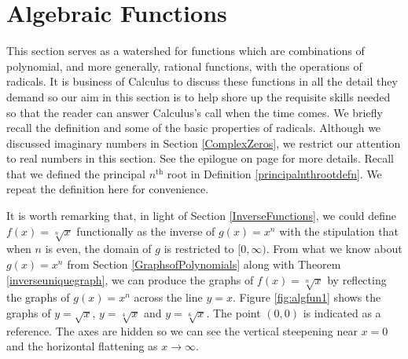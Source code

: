 \section{Algebraic Functions}

\label{AlgebraicFunctions}

This section serves as a watershed for functions which are combinations of polynomial, and more generally, rational functions, with the operations of radicals.  It is business of Calculus to discuss these functions in all the detail they demand so our aim in this section is to help shore up the requisite skills needed so that the reader can answer Calculus's call when the time comes.   We briefly recall the definition and some of the basic properties of radicals. Although we discussed imaginary numbers in Section \ref{ComplexZeros}, we restrict our attention to real numbers in this section.  See the epilogue on page \pageref{complexepilogue} for more details. Recall that we defined the principal $n^{\textrm{th}}$ root in Definition \ref{principalnthrootdefn}. We repeat the definition here for convenience.

\smallskip



\smallskip

It is worth remarking that, in light of Section \ref{InverseFunctions}, we could define $f(x) = \sqrt[n]{x}$ functionally as the inverse of $g(x) = x^n$ with the stipulation that when $n$ is even, the domain of $g$ is restricted to $[0, \infty)$. From what we know about $g(x) = x^n$ from Section \ref{GraphsofPolynomials} along with Theorem \ref{inverseuniquegraph}, we can produce the graphs of $f(x) = \sqrt[n]{x}$ by reflecting the graphs of $g(x) = x^n$ across the line $y=x$.  Figure \ref{fig:algfun1} shows the graphs of $y=\sqrt{x}$, $y=\sqrt[4]{x}$ and $y=\sqrt[6]{x}$.  The point $(0,0)$ is indicated as a reference.  The axes are hidden so we can see the vertical steepening near $x=0$ and the horizontal flattening as $x \rightarrow \infty$.

